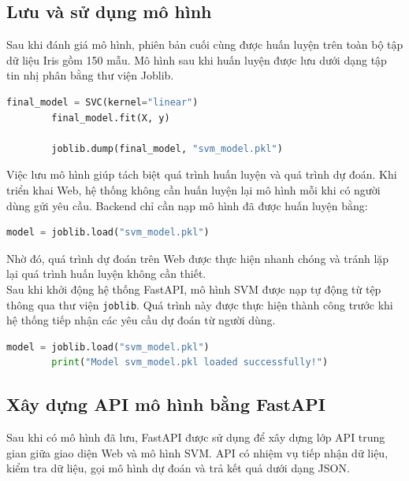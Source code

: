 \documentclass[14pt]{extarticle}
\begin{document}
	\subsection{Lưu và sử dụng mô hình}
	
	\noindent Sau khi đánh giá mô hình, phiên bản cuối cùng được huấn luyện trên toàn bộ tập dữ liệu Iris gồm 150 mẫu. Mô hình sau khi huấn luyện được lưu dưới dạng tập tin nhị phân  bằng thư viện Joblib.
	
	\begin{lstlisting}[language=Python, numbers=none]
		final_model = SVC(kernel="linear")
		final_model.fit(X, y)
		
		joblib.dump(final_model, "svm_model.pkl")
	\end{lstlisting}
	
	\noindent Việc lưu mô hình giúp tách biệt quá trình huấn luyện và quá trình dự đoán. Khi triển khai Web, hệ thống không cần huấn luyện lại mô hình mỗi khi có người dùng gửi yêu cầu. Backend chỉ cần nạp mô hình đã được huấn luyện bằng:
	
	\begin{lstlisting}[language=Python, numbers=none]
		model = joblib.load("svm_model.pkl")
	\end{lstlisting}
	
	\noindent Nhờ đó, quá trình dự đoán trên Web được thực hiện nhanh chóng và tránh lặp lại quá trình huấn luyện không cần thiết.\\
	
	
	\noindent
	Sau khi khởi động hệ thống FastAPI, mô hình SVM được nạp tự động từ tệp
	 thông qua thư viện \texttt{joblib}. 
	Quá trình này được thực hiện thành công trước khi hệ thống tiếp nhận các yêu cầu dự đoán từ người dùng.
	\begin{lstlisting}[language=Python, caption={Nạp mô hình SVM khi khởi động hệ thống}]
		model = joblib.load("svm_model.pkl")
		print("Model svm_model.pkl loaded successfully!")
	\end{lstlisting}
	
	\subsection{Xây dựng API mô hình bằng FastAPI}
	
	\noindent Sau khi có mô hình đã lưu, FastAPI được sử dụng để xây dựng lớp API trung gian giữa giao diện Web và mô hình SVM. API có nhiệm vụ tiếp nhận dữ liệu, kiểm tra dữ liệu, gọi mô hình dự đoán và trả kết quả dưới dạng JSON.
	
\end{document}

